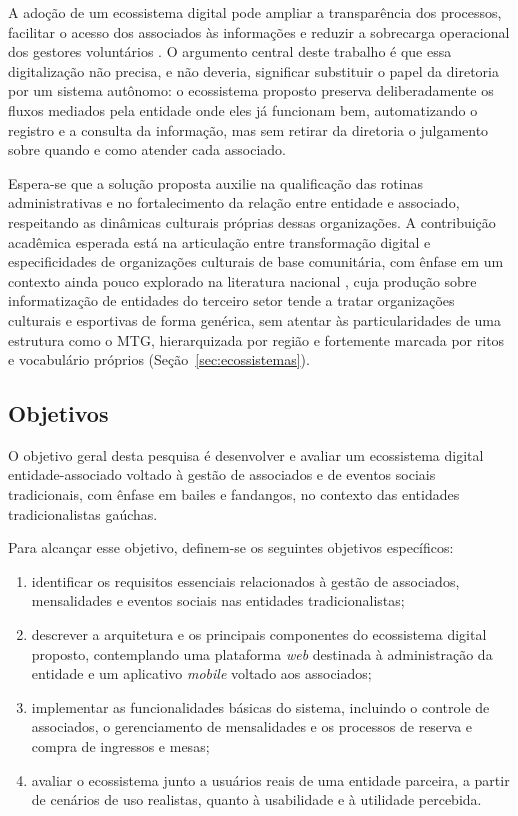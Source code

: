 \documentclass[12pt,a4paper]{article}
\begin{document}
A adoção de um ecossistema digital pode ampliar a transparência dos processos, facilitar o acesso
dos associados às informações e reduzir a sobrecarga operacional dos gestores voluntários
\parencite{fabricio2019}. O argumento central deste trabalho é que essa digitalização não precisa, e
não deveria, significar substituir o papel da diretoria por um sistema autônomo: o ecossistema
proposto preserva deliberadamente os fluxos mediados pela entidade onde eles já funcionam bem,
automatizando o registro e a consulta da informação, mas sem retirar da diretoria o julgamento sobre
quando e como atender cada associado.

Espera-se que a solução proposta auxilie na qualificação das
rotinas administrativas e no fortalecimento da relação entre entidade e associado, respeitando as
dinâmicas culturais próprias dessas organizações. A contribuição acadêmica esperada está na
articulação entre transformação digital e especificidades de organizações culturais de base
comunitária, com ênfase em um contexto ainda pouco explorado na literatura nacional
\parencite{vial2019,verhoef2021}, cuja produção sobre informatização de entidades do terceiro setor
tende a tratar organizações culturais e esportivas de forma genérica, sem atentar às particularidades
de uma estrutura como o MTG, hierarquizada por região e fortemente marcada por ritos e vocabulário
próprios (Seção~\ref{sec:ecossistemas}).

\subsection{Objetivos}

O objetivo geral desta pesquisa é desenvolver e avaliar um ecossistema digital entidade-associado
voltado à gestão de associados e de eventos sociais tradicionais, com ênfase em bailes e fandangos,
no contexto das entidades tradicionalistas gaúchas.

Para alcançar esse objetivo, definem-se os seguintes objetivos específicos:

\begin{enumerate}[label=\alph*)]
  \item identificar os requisitos essenciais relacionados à gestão de associados, mensalidades e
    eventos sociais nas entidades tradicionalistas;
  \item descrever a arquitetura e os principais componentes do ecossistema digital proposto,
    contemplando uma plataforma \textit{web} destinada à administração da entidade e um aplicativo
    \textit{mobile} voltado aos associados;
  \item implementar as funcionalidades básicas do sistema, incluindo o controle de associados, o
    gerenciamento de mensalidades e os processos de reserva e compra de ingressos e mesas;
  \item avaliar o ecossistema junto a usuários reais de uma entidade parceira, a partir de cenários de
    uso realistas, quanto à usabilidade e à utilidade percebida.
\end{enumerate}
\end{document}

